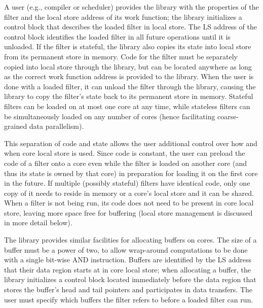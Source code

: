 A user (e.g., compiler or scheduler) provides the library with the
properties of the filter and the local store address of its work
function; the library initializes a control block that describes the
loaded filter in local store. The LS address of the control block
identifies the loaded filter in all future operations until it is
unloaded. If the filter is stateful, the library also copies its state
into local store from its permanent store in memory. Code for the
filter must be separately copied into local store through the library,
but can be located anywhere as long as the correct work function
address is provided to the library. When the user is done with a
loaded filter, it can unload the filter through the library, causing
the library to copy the filter's state back to its permanent store in
memory. Stateful filters can be loaded on at most one core at any
time, while stateless filters can be simultaneously loaded on any
number of cores (hence facilitating coarse-grained data parallelism).

This separation of code and state allows the user additional control
over how and when core local store is used. Since code is constant,
the user can preload the code of a filter onto a core even while the
filter is loaded on another core (and thus its state is owned by that
core) in preparation for loading it on the first core in the
future. If multiple (possibly stateful) filters have identical code,
only one copy of it needs to reside in memory or a core's local store
and it can be shared. When a filter is not being run, its code does
not need to be present in core local store, leaving more space free
for buffering (local store management is discussed in more detail
below).

The library provides similar facilities for allocating buffers on
cores. The size of a buffer must be a power of two, to allow
wrap-around computations to be done with a single bit-wise
\textsf{AND} instruction. Buffers are identified by the LS address
that their data region starts at in core local store; when allocating
a buffer, the library initializes a control block located immediately
before the data region that stores the buffer's head and tail pointers
and participates in data transfers. The user must specify which
buffers the filter refers to before a loaded filter can run.

